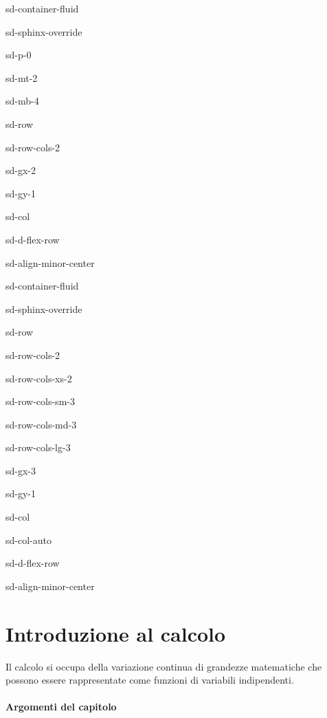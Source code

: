 \documentclass[letterpaper,10pt,italian]{jupyterBook}
\begin{document}
\begin{sphinxuseclass}{sd-container-fluid}
\begin{sphinxuseclass}{sd-sphinx-override}
\begin{sphinxuseclass}{sd-p-0}
\begin{sphinxuseclass}{sd-mt-2}
\begin{sphinxuseclass}{sd-mb-4}
\begin{sphinxuseclass}{sd-row}
\begin{sphinxuseclass}{sd-row-cols-2}
\begin{sphinxuseclass}{sd-gx-2}
\begin{sphinxuseclass}{sd-gy-1}
\begin{sphinxuseclass}{sd-col}
\begin{sphinxuseclass}{sd-d-flex-row}
\begin{sphinxuseclass}{sd-align-minor-center}
\begin{sphinxuseclass}{sd-container-fluid}
\begin{sphinxuseclass}{sd-sphinx-override}
\begin{sphinxuseclass}{sd-row}
\begin{sphinxuseclass}{sd-row-cols-2}
\begin{sphinxuseclass}{sd-row-cols-xs-2}
\begin{sphinxuseclass}{sd-row-cols-sm-3}
\begin{sphinxuseclass}{sd-row-cols-md-3}
\begin{sphinxuseclass}{sd-row-cols-lg-3}
\begin{sphinxuseclass}{sd-gx-3}
\begin{sphinxuseclass}{sd-gy-1}
\begin{sphinxuseclass}{sd-col}
\begin{sphinxuseclass}{sd-col-auto}
\begin{sphinxuseclass}{sd-d-flex-row}
\begin{sphinxuseclass}{sd-align-minor-center}
\end{sphinxuseclass}
\end{sphinxuseclass}
\end{sphinxuseclass}
\end{sphinxuseclass}
\end{sphinxuseclass}
\end{sphinxuseclass}
\end{sphinxuseclass}
\end{sphinxuseclass}
\end{sphinxuseclass}
\end{sphinxuseclass}
\end{sphinxuseclass}
\end{sphinxuseclass}
\end{sphinxuseclass}
\end{sphinxuseclass}
\end{sphinxuseclass}
\end{sphinxuseclass}
\end{sphinxuseclass}
\end{sphinxuseclass}
\end{sphinxuseclass}
\end{sphinxuseclass}
\end{sphinxuseclass}
\end{sphinxuseclass}
\end{sphinxuseclass}
\end{sphinxuseclass}
\end{sphinxuseclass}
\end{sphinxuseclass}

\chapter{Introduzione al calcolo}
\label{\detokenize{ch/calculus:introduzione-al-calcolo}}\label{\detokenize{ch/calculus:math-hs-calculus}}\label{\detokenize{ch/calculus::doc}}
\sphinxAtStartPar
Il calcolo si occupa della variazione continua di grandezze matematiche che possono essere rappresentate come funzioni di variabili indipendenti.
\subsubsection*{Argomenti del capitolo}
\end{document}

